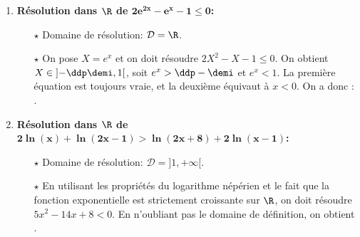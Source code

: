 \begin{correction}
\begin{enumerate}
\item \textbf{R\'esolution dans $\mathbf{\R}$ de $\mathbf{2e^{2x}-e^x-1\leq 0}$:}\\
\noindent \begin{itemize}
\item[$\star$] Domaine de r\'esolution: $\mathcal{D}=\R$.
\item[$\star$] On pose $X=e^x$ et on doit r\'esoudre $2X^2-X-1\leq 0$. On obtient $X \in \left] -\ddp \demi, 1\right[$, soit $e^x>\ddp - \demi$ et $e^x <1$. La première \'equation est toujours vraie, et la deuxi\`eme \'equivaut  \`a $x<0$. On a donc : .
\end{itemize} 
\item \textbf{R\'esolution dans $\mathbf{\R}$ de $\mathbf{2\ln{(x)}+\ln{(2x-1)}>\ln{(2x+8)}+2\ln{(x-1)}}$:}\\
\noindent \begin{itemize}
\item[$\star$] Domaine de r\'esolution: $\mathcal{D}=\rbrack 1,+\infty\lbrack$.
\item[$\star$] En utilisant les propri\'et\'es du logarithme n\'ep\'erien et le fait que la fonction exponentielle est strictement croissante sur $\R$, on doit r\'esoudre $5x^2-14x+8<0$. En n'oubliant pas le domaine de d\'efinition, on obtient .

\end{itemize}
\end{enumerate}
\end{correction}
